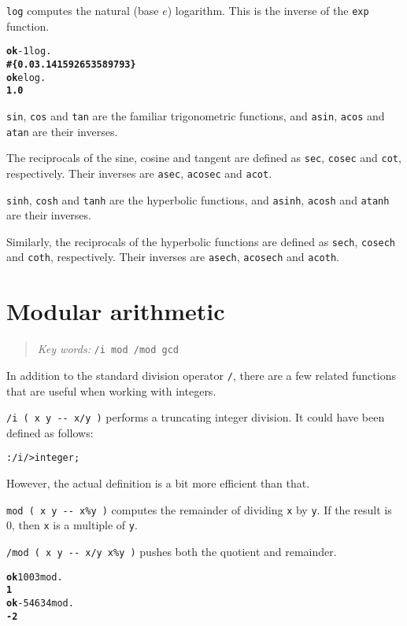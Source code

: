 \documentclass[english]{book}
\newcommand{\chapkeywords}[1]{{\parbox{10cm}{\begin{minipage}[b]{10cm}
\begin{quote}
\emph{Key words:} \texttt{#1}
\end{quote}
\end{minipage}}}}
\begin{document}
\texttt{log} computes the natural (base $e$) logarithm. This is the inverse of the \texttt{exp} function.

\begin{alltt}
\textbf{ok} -1 log .
\textbf{\#\{ 0.0 3.141592653589793 \}}
\textbf{ok} e log .
\textbf{1.0}
\end{alltt}

\texttt{sin}, \texttt{cos} and \texttt{tan} are the familiar trigonometric functions, and \texttt{asin}, \texttt{acos} and \texttt{atan} are their inverses.

The reciprocals of the sine, cosine and tangent are defined as \texttt{sec}, \texttt{cosec} and \texttt{cot}, respectively. Their inverses are \texttt{asec}, \texttt{acosec} and \texttt{acot}.

\texttt{sinh}, \texttt{cosh} and \texttt{tanh} are the hyperbolic functions, and \texttt{asinh}, \texttt{acosh} and \texttt{atanh} are their inverses.

Similarly, the reciprocals of the hyperbolic functions are defined as \texttt{sech}, \texttt{cosech} and \texttt{coth}, respectively. Their inverses are \texttt{asech}, \texttt{acosech} and \texttt{acoth}.

\section{Modular arithmetic}

\chapkeywords{/i mod /mod gcd}

In addition to the standard division operator \texttt{/}, there are a few related functions that are useful when working with integers.

\texttt{/i ( x y -{}- x/y )} performs a truncating integer division. It could have been defined as follows:

\begin{alltt}
: /i / >integer ;
\end{alltt}

However, the actual definition is a bit more efficient than that.

\texttt{mod ( x y -{}- x\%y )} computes the remainder of dividing \texttt{x} by \texttt{y}. If the result is 0, then \texttt{x} is a multiple of \texttt{y}.

\texttt{/mod ( x y -{}- x/y x\%y )} pushes both the quotient and remainder.

\begin{alltt}
\textbf{ok} 100 3 mod .
\textbf{1}
\textbf{ok} -546 34 mod .
\textbf{-2}
\end{alltt}
\end{document}
